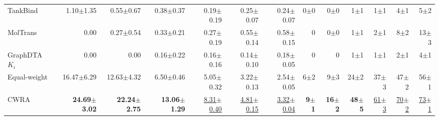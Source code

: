\begin{table}[htbp!]
\begin{tabular}{lrrrrrr|rrrrrr}
TankBind & 1.10$\pm$1.35 & 0.55$\pm$0.67 & 0.38$\pm$0.37 & 0.19$\pm$0.19 & 0.25$\pm$0.07 & 0.24$\pm$0.07 & 0$\pm$0 & 0$\pm$0 & 1$\pm$1 & 1$\pm$1 & 4$\pm$1 & 5$\pm$2 \\
MolTrans & 0.00 & 0.27$\pm$0.54 & 0.33$\pm$0.21 & 0.27$\pm$0.19 & 0.55$\pm$0.14 & 0.58$\pm$0.15 & 0 & 0$\pm$0 & 1$\pm$1 & 2$\pm$1 & 8$\pm$2 & 13$\pm$3 \\
GraphDTA $K_{i}$ & 0.00 & 0.00 & 0.16$\pm$0.22 & 0.16$\pm$0.16 & 0.14$\pm$0.10 & 0.18$\pm$0.05 & 0 & 0 & 1$\pm$1 & 1$\pm$1 & 2$\pm$1 & 4$\pm$1 \\
\midrule
Equal-weight & 16.47$\pm$6.29 & 12.63$\pm$4.32 & 6.50$\pm$0.46 & 5.05$\pm$0.32 & 3.22$\pm$0.13 & 2.54$\pm$0.05 & 6$\pm$2 & 9$\pm$3 & 24$\pm$2 & 37$\pm$3 & 47$\pm$2 & 56$\pm$1 \\
CWRA & \textbf{24.69$\pm$3.02} & \textbf{22.24$\pm$2.75} & \textbf{13.06$\pm$1.29} & \underline{8.31$\pm$0.40} & \underline{4.81$\pm$0.15} & \underline{3.32$\pm$0.04} & \textbf{9$\pm$1} & \textbf{16$\pm$2} & \textbf{48$\pm$5} & \underline{61$\pm$3} & \underline{70$\pm$2} & \underline{73$\pm$1} \\
\bottomrule
\end{tabular}
\end{table}